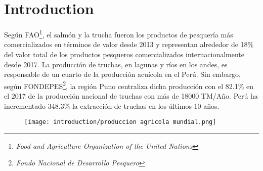 \chapter*{\centering \large Introduction} 

Según FAO\footnote{\textit{Food and Agriculture Organization of the United Nations}}, el salmón y la trucha fueron los productos de pesquería más comercializados en términos de valor desde 2013 y representan alrededor de 18\% del valor total de los productos pesqueros comercializados internacionalmente desde 2017. \cite{FAO2017} La producción de truchas, en lagunas y ríos en los andes, es responsable de un cuarto de la producción acuícola en el Perú.  \cite{SeafoodTradeIntelligencePortal2018} Sin embargo, según FONDEPES\footnote{\textit{Fondo Nacional de Desarrollo Pesquero}}, la región Puno centraliza dicha producción con el 82.1\% en el 2017 de la producción nacional de truchas con más de 18000 TM/Año. \cite{FONDEPES2014} Perú ha incrementado 348.3\% la extracción de truchas en los últimos 10 años. \cite{MinisteriodelaProducciondelPeru2018}

\vspace{1.5cm}
\begin{figure}[H]
	\centering
	\texttt{[image: introduction/produccion agricola mundial.png]}
\end{figure}